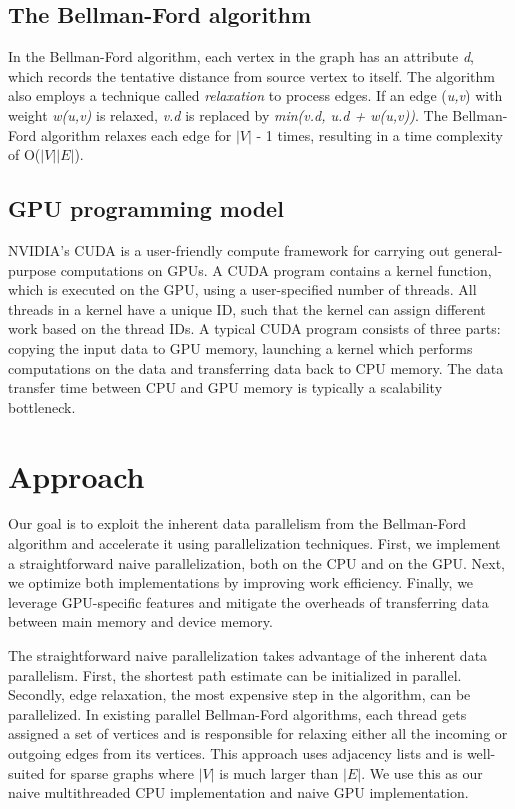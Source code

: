 \documentclass[11pt,a4paper, final, twoside]{article}
\theoremstyle{proposition}
\theoremstyle{definition}
\theoremstyle{remark}
\numberwithin{equation}{section}
\begin{document}
\subsection{The Bellman-Ford algorithm}

In the Bellman-Ford algorithm, each vertex in the graph has an attribute \emph{d}, which records the tentative distance from source vertex to itself. The algorithm also employs a technique called \emph{relaxation} to process edges. If an edge (\emph{u,v}) with weight \emph{w(u,v)} is relaxed, \emph{v.d} is replaced by \emph{min(v.d, u.d + w(u,v))}. The Bellman-Ford algorithm relaxes each edge for $\left|V\right|$ - 1 times, resulting in a time complexity of O($\left|V\right|$$\left|E\right|$).

\subsection{GPU programming model}

NVIDIA's CUDA is a user-friendly compute framework for carrying out general-purpose computations on GPUs\cite{nvi}. A CUDA program contains a kernel function, which is executed on the GPU, using a user-specified number of threads. All threads in a kernel have a unique ID, such that the kernel can assign different work based on the thread IDs. A typical CUDA program consists of three parts: copying the input data to GPU memory, launching a kernel which performs computations on the data and transferring data back to CPU memory. The data transfer time between CPU and GPU memory is typically a scalability bottleneck.
\newpage
\section{Approach}\label{I3}

Our goal is to exploit the inherent data parallelism from the Bellman-Ford algorithm and accelerate it using parallelization techniques. First, we implement a straightforward naive parallelization, both on the CPU and on the GPU. Next, we optimize both implementations by improving work efficiency. Finally, we leverage GPU-specific features and mitigate the overheads of transferring data between main memory and device memory.

The straightforward naive parallelization takes advantage of the inherent data parallelism. First, the shortest path estimate can be initialized in parallel. Secondly, edge relaxation, the most expensive step in the algorithm, can be parallelized. In existing parallel Bellman-Ford algorithms, each thread gets assigned a set of vertices and is responsible for relaxing either all the incoming or outgoing edges from its vertices\cite{Busato2016AnEI}\cite{Harish2007}. This approach uses adjacency lists and is well-suited for sparse graphs where $|V|$ is much larger than $|E|$. We use this as our naive multithreaded CPU implementation and naive GPU implementation. 
\end{document}
